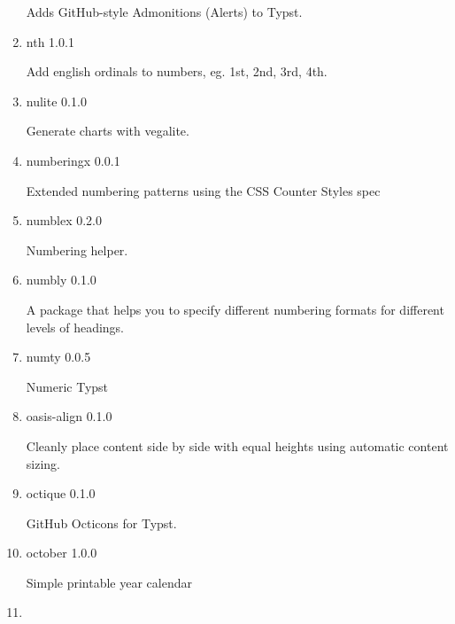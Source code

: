 \begin{enumerate}
  Adds GitHub-style Admonitions (Alerts) to Typst.
\item
  \href{/universe/package/nth/}{}

  { nth } { 1.0.1 }

  Add english ordinals to numbers, eg. 1st, 2nd, 3rd, 4th.
\item
  \href{/universe/package/nulite/}{}

  { nulite } { 0.1.0 }

  Generate charts with vegalite.
\item
  \href{/universe/package/numberingx/}{}

  { numberingx } { 0.0.1 }

  Extended numbering patterns using the CSS Counter Styles spec
\item
  \href{/universe/package/numblex/}{}

  { numblex } { 0.2.0 }

  Numbering helper.
\item
  \href{/universe/package/numbly/}{}

  { numbly } { 0.1.0 }

  A package that helps you to specify different numbering formats for
  different levels of headings.
\item
  \href{/universe/package/numty/}{}

  { numty } { 0.0.5 }

  Numeric Typst
\item
  \href{/universe/package/oasis-align/}{}

  { oasis-align } { 0.1.0 }

  Cleanly place content side by side with equal heights using automatic
  content sizing.
\item
  \href{/universe/package/octique/}{}

  { octique } { 0.1.0 }

  GitHub Octicons for Typst.
\item
  \href{/universe/package/october/}{}


  { october } { 1.0.0 }

  Simple printable year calendar
\item
  \href{/universe/package/ofbnote/}{}



\end{enumerate}
